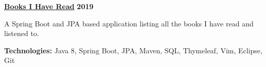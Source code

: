 %
    \headerrow
        {\textbf{\href{https://github.com/johatfie/books_i_have_read}{Books I Have Read}}}
        {\textbf{2019}}
    \vspace{-1.2em}
    \begin{itemize*}
        \item A Spring Boot and JPA based application listing all the books I have read and listened to.
    \end{itemize*}

    \vspace{-0.4em}
    \hspace{1.0em}
        {\textbf{Technologies:} Java 8, Spring Boot, JPA, Maven, SQL, Thymeleaf, Vim, Eclipse, Git}


